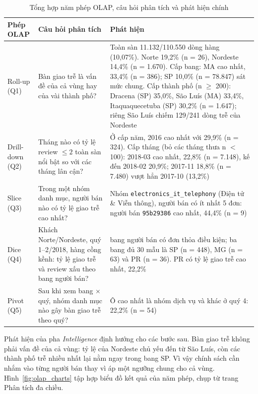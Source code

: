 \documentclass[a4paper]{article}
\begin{document}
\begin{table}[htbp]
\centering
\footnotesize
\setlength{\tabcolsep}{3pt}
\renewcommand{\arraystretch}{1.08}
\caption{Tổng hợp năm phép OLAP, câu hỏi phân tích và phát hiện chính}
\label{tab:olap_findings}
\begin{tabularx}{\textwidth}{@{}>{\raggedright\arraybackslash}p{1.9cm}>{\raggedright\arraybackslash}p{5.2cm}>{\raggedright\arraybackslash}X@{}}
\toprule
\textbf{Phép OLAP} & \textbf{Câu hỏi phân tích} & \textbf{Phát hiện} \\
\midrule
Roll-up (Q1) & Bàn giao trễ là vấn đề của cả vùng hay của vài thành phố? & Toàn sàn 11.132/110.550 dòng hàng (10,07\%). Norte 19,2\% (n = 26), Nordeste 14,4\% (n = 1.670). Cấp bang: MA cao nhất, 33,4\% (n = 386); SP 10,0\% (n = 78.847) sát mức chung. Cấp thành phố (n $\ge$ 200): Dracena (SP) 35,0\%, São Luís (MA) 33,4\%, Itaquaquecetuba (SP) 30,2\% (n = 1.647); riêng São Luís chiếm 129/241 dòng trễ của Nordeste \\
\addlinespace
Drill-down (Q2) & Tháng nào có tỷ lệ review $\le 2$ toàn sàn nổi bật so với các tháng lân cận? & Ở cấp năm, 2016 cao nhất với 29,9\% (n = 324). Cấp tháng (bỏ các tháng thưa n $<$ 100): 2018-03 cao nhất, 22,8\% (n = 7.148), kế đến 2018-02 20,9\%; 2017-11 18,8\% (n = 7.480) vượt hẳn 2017-10 (13,2\%) \\
\addlinespace
Slice (Q3) & Trong một nhóm danh mục, người bán nào có tỷ lệ giao trễ cao nhất? & Nhóm \texttt{electronics\_\allowbreak{}it\_\allowbreak{}telephony} (Điện tử \& Viễn thông), người bán có ít nhất 5 đơn: người bán \texttt{95b29386} cao nhất, 44,4\% (n = 9) \\
\addlinespace
Dice (Q4) & Khách Norte/Nordeste, quý 1--2/2018, hàng cồng kềnh: tỷ lệ giao trễ và review xấu theo bang người bán? & 13 bang người bán có đơn thỏa điều kiện; ba bang đủ 30 mẫu là SP (n = 448), MG (n = 63) và PR (n = 36). PR có tỷ lệ giao trễ cao nhất, 22,2\% \\
\addlinespace
Pivot (Q5) & Sau khi xem bang $\times$ quý, nhóm danh mục nào gây bàn giao trễ theo quý? & Ô cao nhất là nhóm dịch vụ và khác ở quý 4: 22,2\% (n = 54) \\
\bottomrule
\end{tabularx}
\end{table}

Phát hiện của pha \textit{Intelligence} định hướng cho các bước sau. Bàn giao trễ không phải vấn đề của cả vùng: tỷ lệ của Nordeste chủ yếu đến từ São Luís, còn các thành phố trễ nhiều nhất lại nằm ngay trong bang SP. Vì vậy chính sách cần nhắm vào từng người bán thay vì áp một ngưỡng chung cho cả vùng. Hình~\ref{fig:olap_charts} tập hợp biểu đồ kết quả của năm phép, chụp từ trang Phân tích đa chiều.
\end{document}
